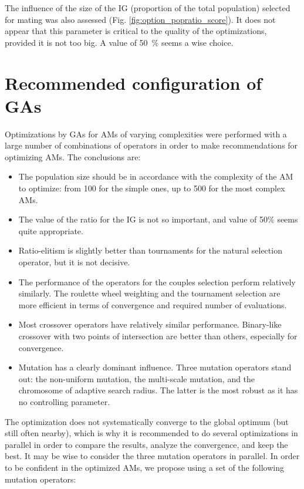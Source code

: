 \documentclass{ametsoc}
\begin{document}
The influence of the size of the IG (proportion of the total population) selected for mating was also assessed (Fig. \ref{fig:option_popratio_score}). It does not appear that this parameter is critical to the quality of the optimizations, provided it is not too big. A value of 50~\% seems a wise choice.


\section{Recommended configuration of GAs}
\label{sec:recommendations}

Optimizations by GAs for AMs of varying complexities were performed with a large number of combinations of operators in order to make recommendations for optimizing AMs. The conclusions are:

\begin{itemize}
	\item The population size should be in accordance with the complexity of the AM to optimize: from 100 for the simple ones, up to 500 for the most complex AMs.
	
	\item The value of the ratio for the IG is not so important, and value of 50\% seems quite appropriate.
	
	\item Ratio-elitism is slightly better than tournaments for the natural selection operator, but it is not decisive.
	
	\item The performance of the operators for the couples selection perform relatively similarly. The roulette wheel weighting and the tournament selection are more efficient in terms of convergence and required number of evaluations.
	
	\item Most crossover operators have relatively similar performance. Binary-like crossover with two points of intersection are better than others, especially for convergence.
	
	\item Mutation has a clearly dominant influence. Three mutation operators stand out: the non-uniform mutation, the multi-scale mutation, and the chromosome of adaptive search radius. The latter is the most robust as it has no controlling parameter.
	
\end{itemize}

The optimization does not systematically converge to the global optimum (but still often nearby), which is why it is recommended to do several optimizations in parallel in order to compare the results, analyze the convergence, and keep the best. It may be wise to consider the three mutation operators in parallel. In order to be confident in the optimized AMs, we propose using a set of the following mutation operators:
\end{document}
